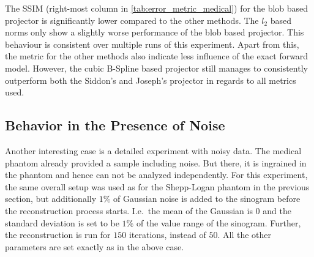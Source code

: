 The \gls{SSIM} (right-most column in \autoref{tab:error_metric_medical}) for the blob based
projector is significantly lower compared to the other methods. The \(l_2\) based norms only show a
slightly worse performance of the blob based projector. This behaviour is consistent over multiple
runs of this experiment. Apart from this, the metric for the other methods also indicate less
influence of the exact forward model. However, the cubic B-Spline based projector still manages to
consistently outperform both the Siddon's and Joseph's projector in regards to all metrics used.

\subsection{Behavior in the Presence of Noise}

Another interesting case is a detailed experiment with noisy data. The medical phantom already
provided a sample including noise. But there, it is ingrained in the phantom and hence can not be
analyzed independently. For this experiment, the same overall setup was used as for the Shepp-Logan
phantom in the previous section, but additionally \(1\%\) of Gaussian noise is added to the sinogram
before the reconstruction process starts. I.e.\ the mean of the Gaussian is \(0\) and the standard
deviation is set to be \(1\%\) of the value range of the sinogram. Further, the reconstruction is
run for \(150\) iterations, instead of \(50\). All the other parameters are set exactly as in the
above case.

